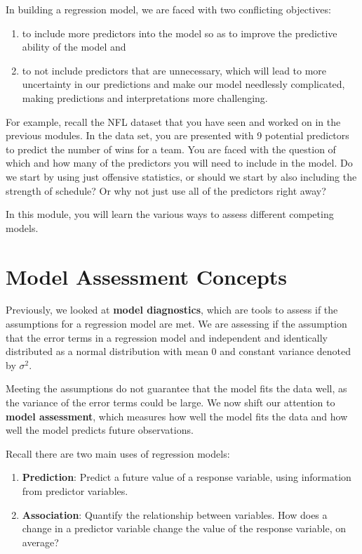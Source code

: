 \documentclass[
]{book}
\providecommand{\tightlist}{%
  \setlength{\itemsep}{0pt}\setlength{\parskip}{0pt}}
\begin{document}
In building a regression model, we are faced with two conflicting objectives:

\begin{enumerate}
\def\labelenumi{\arabic{enumi}.}
\tightlist
\item
  to include more predictors into the model so as to improve the predictive ability of the model and
\item
  to not include predictors that are unnecessary, which will lead to more uncertainty in our predictions and make our model needlessly complicated, making predictions and interpretations more challenging.
\end{enumerate}

For example, recall the NFL dataset that you have seen and worked on in the previous modules. In the data set, you are presented with 9 potential predictors to predict the number of wins for a team. You are faced with the question of which and how many of the predictors you will need to include in the model. Do we start by using just offensive statistics, or should we start by also including the strength of schedule? Or why not just use all of the predictors right away?

In this module, you will learn the various ways to assess different competing models.

\hypertarget{model-assessment-concepts}{%
\section{Model Assessment Concepts}\label{model-assessment-concepts}}

Previously, we looked at \textbf{model diagnostics}, which are tools to assess if the assumptions for a regression model are met. We are assessing if the assumption that the error terms in a regression model and independent and identically distributed as a normal distribution with mean 0 and constant variance denoted by \(\sigma^2\).

Meeting the assumptions do not guarantee that the model fits the data well, as the variance of the error terms could be large. We now shift our attention to \textbf{model assessment}, which measures how well the model fits the data and how well the model predicts future observations.

Recall there are two main uses of regression models:

\begin{enumerate}
\def\labelenumi{\arabic{enumi}.}
\tightlist
\item
  \textbf{Prediction}: Predict a future value of a response variable, using information from predictor variables.
\item
  \textbf{Association}: Quantify the relationship between variables. How does a change in a predictor variable change the value of the response variable, on average?
\end{enumerate}
\end{document}
